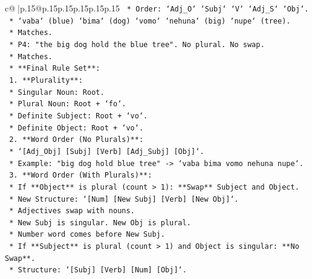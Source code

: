 \documentclass{article}
\begin{document}
{\begin{supertabular}{c@{$\;$}|p{.15\linewidth}@{}p{.15\linewidth}p{.15\linewidth}p{.15\linewidth}p{.15\linewidth}p{.15\linewidth}}
{{{\texttt{                                *   Order: `Adj\_O` `Subj` `V` `Adj\_S` `Obj`.} \\
\texttt{                                *   `vaba` (blue) `bima` (dog) `vomo` `nehuna` (big) `nupe` (tree).} \\
\texttt{                                *   Matches.} \\
\texttt{                            *   P4: "the big dog hold the blue tree". No plural. No swap.} \\
\texttt{                                *   Matches.} \\
\texttt{            *   **Final Rule Set**:} \\
\texttt{                1.  **Plurality**:} \\
\texttt{                    *   Singular Noun: Root.} \\
\texttt{                    *   Plural Noun: Root + `fo`.} \\
\texttt{                    *   Definite Subject: Root + `vo`.} \\
\texttt{                    *   Definite Object: Root + `vo`.} \\
\texttt{                2.  **Word Order (No Plurals)**:} \\
\texttt{                    *   `{[}Adj\_Obj{]} {[}Subj{]} {[}Verb{]} {[}Adj\_Subj{]} {[}Obj{]}`.} \\
\texttt{                    *   Example: "big dog hold blue tree" {-}> `vaba bima vomo nehuna nupe`.} \\
\texttt{                3.  **Word Order (With Plurals)**:} \\
\texttt{                    *   If **Object** is plural (count > 1): **Swap** Subject and Object.} \\
\texttt{                        *   New Structure: `{[}Num{]} {[}New Subj{]} {[}Verb{]} {[}New Obj{]}`.} \\
\texttt{                        *   Adjectives swap with nouns.} \\
\texttt{                        *   New Subj is singular. New Obj is plural.} \\
\texttt{                        *   Number word comes before New Subj.} \\
\texttt{                    *   If **Subject** is plural (count > 1) and Object is singular: **No Swap**.} \\
\texttt{                        *   Structure: `{[}Subj{]} {[}Verb{]} {[}Num{]} {[}Obj{]}`.} \\
}}}
\end{supertabular}}
\end{document}
